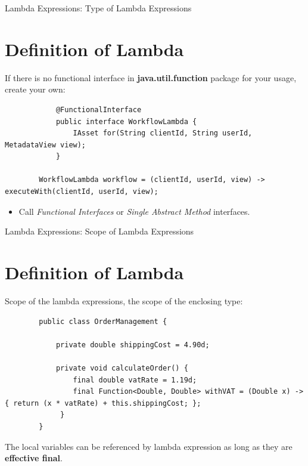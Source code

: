 \documentclass{beamer}
\begin{document}
	\begin{frame}[fragile]{Lambda Expressions: Type of Lambda Expressions}
		\section{Definition of Lambda}
		If there is no functional interface in \textbf{java.util.function} package for your usage, create your own:
		\begin{lstlisting}
			@FunctionalInterface
			public interface WorkflowLambda {
			    IAsset for(String clientId, String userId, MetadataView view);
			}

		WorkflowLambda workflow = (clientId, userId, view) -> executeWith(clientId, userId, view);
		\end{lstlisting}
		
		\begin{itemize}
			\item Call \textit{Functional Interfaces} or \textit{Single Abstract Method} interfaces.
		\end{itemize}
				
	\end{frame}	


	\begin{frame}[fragile]{Lambda Expressions: Scope of Lambda Expressions}
		\section{Definition of Lambda}
		
		Scope of the lambda expressions, the scope of the enclosing type:
		\begin{lstlisting}
		public class OrderManagement {

  			private double shippingCost = 4.90d;

  			private void calculateOrder() {
    			final double vatRate = 1.19d;
    			final Function<Double, Double> withVAT = (Double x) -> { return (x * vatRate) + this.shippingCost; };
 			 }
		}
		\end{lstlisting}
		
		The local variables can be referenced by lambda expression as long as they are \textbf{effective final}.
	\end{frame}	
	
\end{document}
